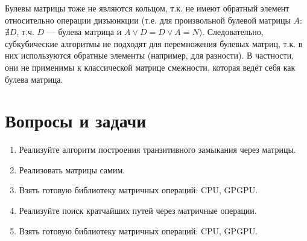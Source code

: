 Булевы матрицы тоже не являются кольцом, т.к. не имеют обратный элемент относительно операции дизъюнкции (т.е. для произвольной булевой матрицы $A$: $\nexists D$, т.ч. $D$ --- булева матрица и $A \vee D = D \vee A = N$). Следовательно, субкубические алгоритмы не подходят для перемножения булевых матриц, т.к. в них используются обратные элементы (например, для разности). В частности, они не применимы к классической матрице смежности, которая ведёт себя как булева матрица.

\section{Вопросы и задачи}
\begin{enumerate}
  \item Реализуйте алгоритм построения транзитивного замыкания через матрицы.
  \item Реализовать матрицы самим.
  \item Взять готовую библиотеку матричных операций: CPU, GPGPU.
  \item Реализуйте поиск кратчайших путей через матричные операции.
  \item Взять готовую библиотеку матричных операций: CPU, GPGPU.
\end{enumerate}
